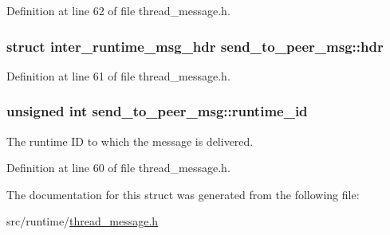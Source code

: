 Definition at line 62 of file thread\-\_\-message.\-h.

\hypertarget{structsend__to__peer__msg_a5e233e774179fa4a3dbe2706c0c9955f}{
\subsubsection[{hdr}]{\setlength{\rightskip}{0pt plus 5cm}struct {\bf inter\-\_\-runtime\-\_\-msg\-\_\-hdr} send\-\_\-to\-\_\-peer\-\_\-msg\-::hdr}}\label{structsend__to__peer__msg_a5e233e774179fa4a3dbe2706c0c9955f}


Definition at line 61 of file thread\-\_\-message.\-h.

\hypertarget{structsend__to__peer__msg_a291ea22d7a3784c77f7df0c78e06b84a}{
\subsubsection[{runtime\-\_\-id}]{\setlength{\rightskip}{0pt plus 5cm}unsigned int send\-\_\-to\-\_\-peer\-\_\-msg\-::runtime\-\_\-id}}\label{structsend__to__peer__msg_a291ea22d7a3784c77f7df0c78e06b84a}


The runtime I\-D to which the message is delivered. 



Definition at line 60 of file thread\-\_\-message.\-h.



The documentation for this struct was generated from the following file\-:\begin{DoxyCompactItemize}
\item 
src/runtime/\hyperlink{thread__message_8h}{thread\-\_\-message.\-h}\end{DoxyCompactItemize}
